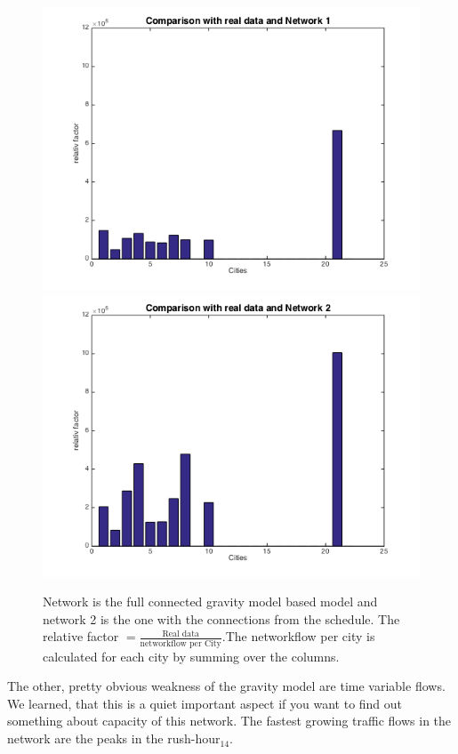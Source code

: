 \documentclass[11pt]{article}
\begin{document}
\begin{figure}[h]
\includegraphics[scale=0.4]{compare1}
\includegraphics[scale=0.4]{compare2}
 \caption{Network is the full connected gravity model based model and network 2 is the one with the connections from the schedule. The relative factor $=\frac{\text{Real data}}{\text{networkflow per City}}$.The networkflow per city is calculated for each city by summing over the columns.}
\end{figure}



The other, pretty obvious weakness of the gravity model are time variable flows. We learned, that this is a quiet important aspect if you want to find out something about capacity of this network. The fastest growing traffic flows in the network are the peaks in the rush-hour$_{14}$.
\end{document}
